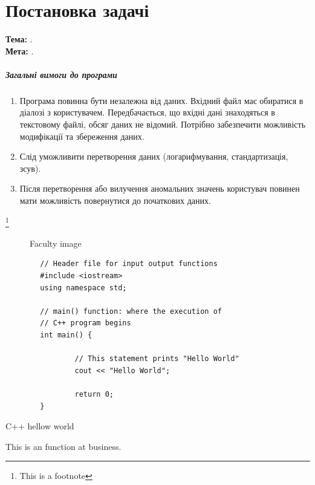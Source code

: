 \documentclass[../../document]{subfiles}
\begin{document}
\chapter{Постановка задачі}
\textbf{Тема:} \worktheme.\\
\textbf{Мета:} \workobjective.

\paragraph*{Загальні вимоги до програми}
\begin{enumerate}
	\item Програма повинна бути незалежна від даних. Вхідний файл має
		обиратися в діалозі з користувачем. Передбачається, що вхідні дані знаходяться
		в текстовому файлі, обсяг даних не відомий. Потрібно забезпечити можливість
		модифікації та збереження даних.
	\item Слід уможливити перетворення даних (логарифмування,
		стандартизація, зсув).
	\item Після перетворення або вилучення аномальних значень користувач
		повинен мати можливість повернутися до початкових даних.
\end{enumerate}

\blindtext\footnote{This is a footnote}

\begin{figure}
	\begin{center}
	\end{center}
	\caption{Faculty image}\label{fig:pm}
\end{figure}

\blindtext

\begin{longlisting}
	\begin{verbatim}
		// Header file for input output functions
		#include <iostream>
		using namespace std;

		// main() function: where the execution of
		// C++ program begins
		int main() {

				// This statement prints "Hello World"
				cout << "Hello World";

				return 0;
		}
	\end{verbatim}
	\caption{C++ hellow world}\label{lst:code}
\end{longlisting}
This is an  function at business. \blindtext
\end{document}
